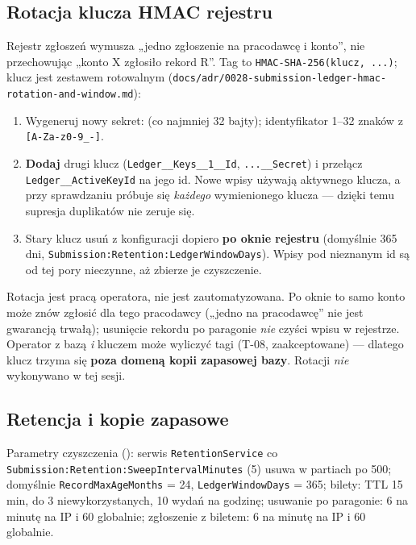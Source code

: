 {\subsection{Rotacja klucza HMAC rejestru}

Rejestr zgłoszeń wymusza „jedno zgłoszenie na pracodawcę i konto”, nie
przechowując „konto X zgłosiło rekord R”. Tag to
\texttt{HMAC-SHA-256(klucz, ...)}; klucz jest zestawem rotowalnym
(\texttt{docs/\allowbreak{}adr/\allowbreak{}0028-\allowbreak{}submission-\allowbreak{}ledger-\allowbreak{}hmac-\allowbreak{}rotation-\allowbreak{}and-\allowbreak{}window.\allowbreak{}md}):

\begin{enumerate}[leftmargin=*,itemsep=2pt]
  \item Wygeneruj nowy sekret:  (co najmniej 32
        bajty); identyfikator 1--32 znaków z \texttt{[A-Za-z0-9\_-]}.
  \item \textbf{Dodaj} drugi klucz (\texttt{Ledger\_\allowbreak{}\_\allowbreak{}Keys\_\allowbreak{}\_\allowbreak{}1\_\allowbreak{}\_\allowbreak{}Id},
        \texttt{...\_\_Secret}) i przełącz \texttt{Ledger\_\allowbreak{}\_\allowbreak{}ActiveKeyId} na jego
        id. Nowe wpisy używają aktywnego klucza, a przy sprawdzaniu próbuje się
        \emph{każdego} wymienionego klucza --- dzięki temu supresja duplikatów nie
        zeruje się.
  \item Stary klucz usuń z konfiguracji dopiero \textbf{po oknie rejestru}
        (domyślnie 365 dni, \texttt{Submission:\allowbreak{}Retention:\allowbreak{}LedgerWindowDays}).
        Wpisy pod nieznanym id są od tej pory nieczynne, aż zbierze je czyszczenie.
\end{enumerate}

Rotacja jest pracą operatora, nie jest zautomatyzowana. Po oknie to samo konto może
znów zgłosić dla tego pracodawcy („jedno na pracodawcę” nie jest gwarancją trwałą);
usunięcie rekordu po paragonie \emph{nie} czyści wpisu w rejestrze. Operator z bazą
\emph{i} kluczem może wyliczyć tagi (T-08, zaakceptowane) --- dlatego klucz trzyma się
\textbf{poza domeną kopii zapasowej bazy}. Rotacji \emph{nie} wykonywano w tej sesji.

\subsection{Retencja i kopie zapasowe}

Parametry czyszczenia (): serwis
\texttt{RetentionService} co \texttt{Submission:\allowbreak{}Retention:\allowbreak{}SweepIntervalMinutes}
(5) usuwa w partiach po 500; domyślnie \texttt{RecordMaxAgeMonths} = 24,
\texttt{LedgerWindowDays} = 365; bilety: TTL 15 min, do 3 niewykorzystanych, 10
wydań na godzinę; usuwanie po paragonie: 6 na minutę na IP i 60 globalnie;
zgłoszenie z biletem: 6 na minutę na IP i 60 globalnie.

}
